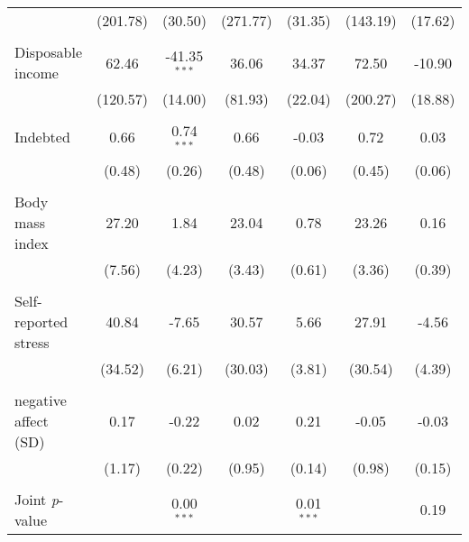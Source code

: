 {\begin{tabular}{l*{6}{c}}
          & (201.78)&  (30.50)& (271.77)&  (31.35)& (143.19)&  (17.62)\\
          &         &         &         &         &         &         \\
Disposable income&    62.46&-41.35$^{***}$&    36.06&    34.37&    72.50&   -10.90\\
          & (120.57)&  (14.00)&  (81.93)&  (22.04)& (200.27)&  (18.88)\\
          &         &         &         &         &         &         \\
Indebted  &     0.66&0.74$^{***}$&     0.66&    -0.03&     0.72&     0.03\\
          &   (0.48)&   (0.26)&   (0.48)&   (0.06)&   (0.45)&   (0.06)\\
          &         &         &         &         &         &         \\
Body mass index&    27.20&     1.84&    23.04&     0.78&    23.26&     0.16\\
          &   (7.56)&   (4.23)&   (3.43)&   (0.61)&   (3.36)&   (0.39)\\
          &         &         &         &         &         &         \\
Self-reported stress&    40.84&    -7.65&    30.57&     5.66&    27.91&    -4.56\\
          &  (34.52)&   (6.21)&  (30.03)&   (3.81)&  (30.54)&   (4.39)\\
          &         &         &         &         &         &         \\
negative affect (SD)&     0.17&    -0.22&     0.02&     0.21&    -0.05&    -0.03\\
          &   (1.17)&   (0.22)&   (0.95)&   (0.14)&   (0.98)&   (0.15)\\
          &         &         &         &         &         &         \\
\midrule Joint \emph{p}-value&         &0.00$^{***}$&         &0.01$^{***}$&         &     0.19\\
\bottomrule
\end{tabular}
}

